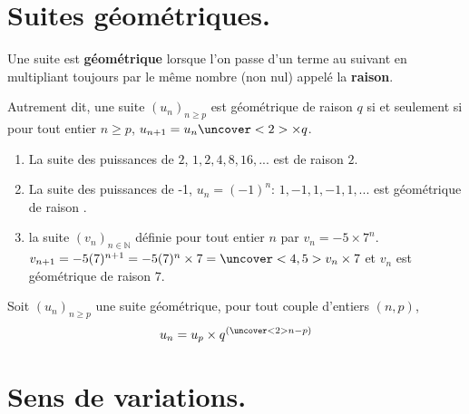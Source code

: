 \documentclass{beamer}
\begin{document}
        \section{Suites géométriques.}
        
        \begin{frame}
  \begin{definition} 
    
   Une suite est \textbf{géométrique} lorsque l'on passe d'un terme au suivant en multipliant toujours 
   par le même nombre (non nul) appelé la \textbf{raison}.
   
   Autrement dit, une suite $(u_n)_{n \geq p}$ est géométrique de raison $q$ si et seulement si 
   pour tout entier $n \geq p$, $u_{n+1}=u_n \uncover<2>{\times q}$.
   \end{definition}
   \end{frame}
   
   \begin{frame}
   \begin{example}
    
  \begin{enumerate}
   \item La suite des puissances de $2$, $1,2,4,8,16,...$ est  de raison $2$.
   \item La suite des puissances de -1, $u_n=(-1)^n$: $1,-1,1,-1,1,...$ est géométrique de raison 
   .
   \item la suite $(v_n)_{n \in \mathbb{N}}$ définie pour tout entier $n$ par $v_n=-5 \times 7^n$.
   $v_{n+1}=-5 (7)^{n+1}=-5(7)^n \times 7=\uncover<4,5>{v_n} \times 7$ et $v_n$ est 
   {géométrique de raison $7$}.
  \end{enumerate}  
   \end{example}
   \end{frame}
   
   \begin{frame}
   \begin{theorem}
    Soit $(u_n)_{n \geq p}$ une suite géométrique, pour tout couple d'entiers $(n,p)$, 
    $$u_n=u_p\times q^{(\uncover<2>{n-p})}$$
   \end{theorem}
   \end{frame}
   
    \section{Sens de variations.}
  
\end{document}
